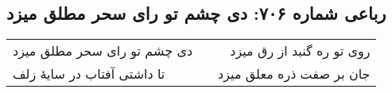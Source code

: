 \begin{center}
\section*{رباعی شماره ۷۰۶: دی چشم تو رای سحر مطلق میزد}
\label{sec:0706}
\begin{longtable}{l p{0.5cm} r}
دی چشم تو رای سحر مطلق میزد
&&
روی تو ره گنبد از رق میزد
\\
تا داشتی آفتاب در سایهٔ زلف
&&
جان بر صفت ذره معلق میزد
\\
\end{longtable}
\end{center}
